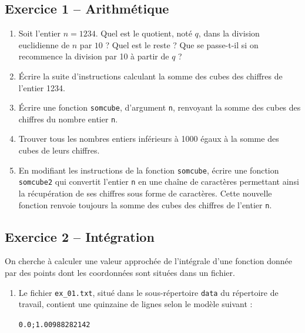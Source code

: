 \documentclass[10pt,fleqn]{article} %
\begin{document}


\def\columnseprulecolor{\color{ocre}}
\setlength{\columnseprule}{0.4pt} 

\begin{multicols}{2}
\subsection*{Exercice 1 -- Arithmétique}
\begin{enumerate}
\item Soit l’entier $n = 1234$. Quel est le quotient, noté $q$, dans la division euclidienne de $n$ par $10$ ? Quel est
le reste ? Que se passe-t-il si on recommence la division par 10 à partir de $q$ ?
\item Écrire la suite d’instructions calculant la somme des cubes des chiffres de l’entier 1234.
\item Écrire une fonction \texttt{somcube}, d’argument \texttt{n}, renvoyant la somme des cubes des chiffres du nombre
entier \texttt{n}.
\item Trouver tous les nombres entiers inférieurs à 1000 égaux à la somme des cubes de leurs chiffres.
\item En modifiant les instructions de la fonction \texttt{somcube}, écrire une fonction \texttt{somcube2} qui convertit
l’entier \texttt{n} en une chaîne de caractères permettant ainsi la récupération de ses chiffres sous forme de
caractères. Cette nouvelle fonction renvoie toujours la somme des cubes des chiffres de l’entier \texttt{n}.
\end{enumerate}


\subsection*{Exercice 2 -- Intégration}
On cherche à calculer une valeur approchée de l’intégrale d’une fonction donnée par des points dont les coordonnées sont situées dans un fichier.
\begin{enumerate}
\item Le fichier \texttt{ex\_01.txt}, situé dans le sous-répertoire \texttt{data} du répertoire de travail, contient une quinzaine de lignes selon le modèle suivant :

\begin{center}

\texttt{0.0;1.00988282142}


\end{center}
\end{enumerate}
\end{multicols}
\end{document}
